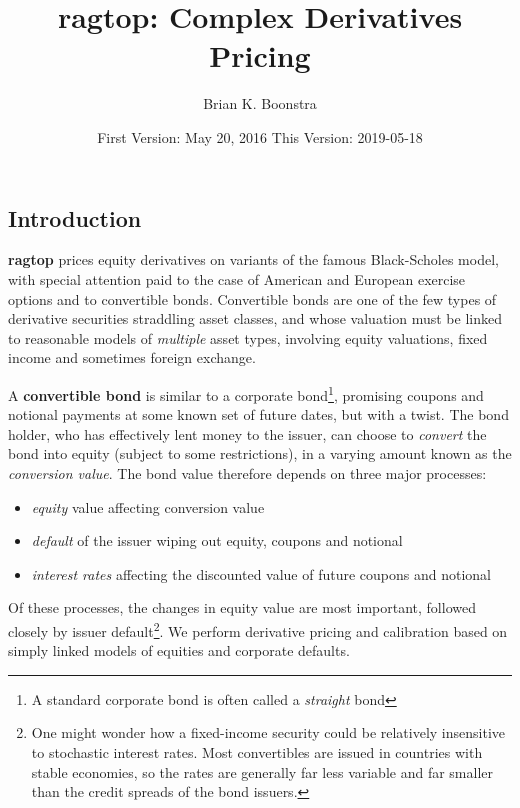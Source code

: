 \documentclass[]{article}
\title{ragtop: Complex Derivatives Pricing}
\author{Brian K. Boonstra}
\date{First Version: May 20, 2016 This Version: 2019-05-18}
\providecommand{\tightlist}{%
  \setlength{\itemsep}{0pt}\setlength{\parskip}{0pt}}
\let\rmarkdownfootnote\footnote%
\def\footnote{\protect\rmarkdownfootnote}
\begin{document}
\maketitle

{
\setcounter{tocdepth}{2}
\tableofcontents
}
\hypertarget{introduction}{%
\subsection{Introduction}\label{introduction}}

\textbf{ragtop} prices equity derivatives on variants of the famous
Black-Scholes model, with special attention paid to the case of American
and European exercise options and to convertible bonds. Convertible
bonds are one of the few types of derivative securities straddling asset
classes, and whose valuation must be linked to reasonable models of
\emph{multiple} asset types, involving equity valuations, fixed income
and sometimes foreign exchange.

A \textbf{convertible bond} is similar to a corporate bond\footnote{A
  standard corporate bond is often called a \emph{straight} bond},
promising coupons and notional payments at some known set of future
dates, but with a twist. The bond holder, who has effectively lent money
to the issuer, can choose to \emph{convert} the bond into equity
(subject to some restrictions), in a varying amount known as the
\emph{conversion value}. The bond value therefore depends on three major
processes:

\begin{itemize}
\tightlist
\item
  \emph{equity} value affecting conversion value
\item
  \emph{default} of the issuer wiping out equity, coupons and notional
\item
  \emph{interest rates} affecting the discounted value of future coupons
  and notional
\end{itemize}

Of these processes, the changes in equity value are most important,
followed closely by issuer default\footnote{One might wonder how a
  fixed-income security could be relatively insensitive to stochastic
  interest rates. Most convertibles are issued in countries with stable
  economies, so the rates are generally far less variable and far
  smaller than the credit spreads of the bond issuers.}. We perform
derivative pricing and calibration based on simply linked models of
equities and corporate defaults.
\end{document}
